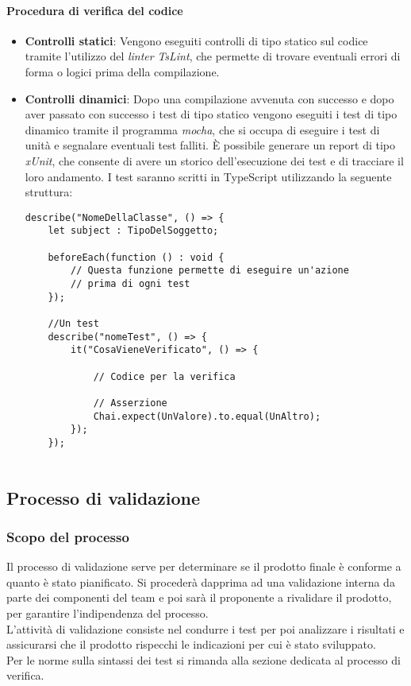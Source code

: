 \paragraph*{Procedura di verifica del codice}
\begin{itemize}

\item \textbf{Controlli statici}: Vengono eseguiti controlli di tipo statico sul codice tramite l'utilizzo del \textit{linter} \textit{TsLint}, che permette di trovare eventuali errori di forma o logici prima della compilazione.

\item \textbf{Controlli dinamici}: Dopo una compilazione avvenuta con successo e dopo aver passato con successo i test di tipo statico vengono eseguiti i test di tipo dinamico tramite il programma \textit{mocha}, che si occupa di eseguire i test di unità e segnalare eventuali test falliti. È possibile generare un report di tipo \textit{xUnit}, che consente di avere un storico dell'esecuzione dei test e di tracciare il loro andamento. I test saranno scritti in TypeScript utilizzando la seguente struttura:
\begin{verbatim}
describe("NomeDellaClasse", () => {
    let subject : TipoDelSoggetto;

    beforeEach(function () : void {
        // Questa funzione permette di eseguire un'azione
        // prima di ogni test
    });

    //Un test
    describe("nomeTest", () => {
        it("CosaVieneVerificato", () => {

            // Codice per la verifica

            // Asserzione
            Chai.expect(UnValore).to.equal(UnAltro);
        });
    });
  
\end{verbatim}

\end{itemize}

\subsection{Processo di validazione}
\subsubsection{Scopo del processo}
Il processo di validazione serve per determinare se il prodotto finale è conforme a quanto è stato pianificato. Si procederà dapprima ad una validazione interna da parte dei componenti del team e poi sarà il proponente a rivalidare il prodotto, per garantire l'indipendenza del processo. \\
L'attività di validazione consiste nel condurre i test per poi analizzare i risultati e assicurarsi che il prodotto rispecchi le indicazioni per cui è stato sviluppato. \\
Per le norme sulla sintassi dei test si rimanda alla sezione dedicata al processo di verifica.

